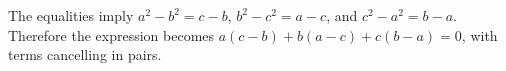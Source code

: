 The equalities imply $a^2-b^2=c-b$, $b^2-c^2=a-c$, and $c^2-a^2=b-a$. Therefore the expression becomes $a(c-b)+b(a-c)+c(b-a)=\boxed0$, with terms cancelling in pairs.
